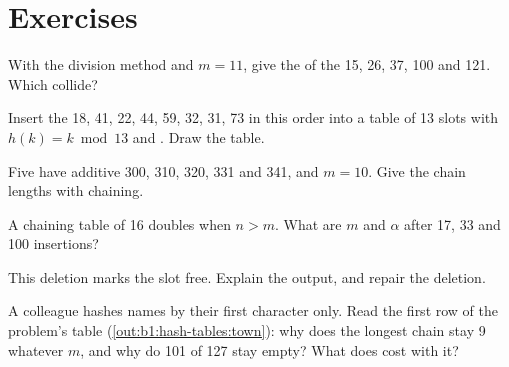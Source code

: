 \section{Exercises}\label{sec:b1:hash-tables:exercises}

\begin{exercise}[$\star$]\label{exo:b1:hash-tables:1}
With the division method and $m = 11$, give the  of the  15, 26, 37, 100 and 121. Which collide?
\end{exercise}

\begin{exercise}[$\star$]\label{exo:b1:hash-tables:2}
Insert the  18, 41, 22, 44, 59, 32, 31, 73 in this order into a table of 13 slots with $h(k) = k \bmod 13$ and
. Draw the table.
\end{exercise}

\begin{exercise}[$\star$]\label{exo:b1:hash-tables:3}
Five  have additive  300, 310, 320, 331 and 341, and $m = 10$. Give the chain lengths with chaining.
\end{exercise}

\begin{exercise}[$\star$]\label{exo:b1:hash-tables:4}
A chaining table of 16  doubles when $n > m$. What are $m$ and $\alpha$ after 17, 33 and 100 insertions?
\end{exercise}

\begin{exercise}[$\star\star$]\label{exo:b1:hash-tables:5}
This deletion marks the slot free. Explain the output, and repair the deletion.
\end{exercise}

\begin{exercise}[$\star\star$]\label{exo:b1:hash-tables:6}
A colleague hashes names by their first character only. Read the first row of the problem's table
(\cref{out:b1:hash-tables:town}): why does the longest chain stay 9 whatever $m$, and why do 101 of 127  stay
empty? What does  cost with it?
\end{exercise}

